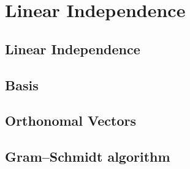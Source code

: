 \section{Linear Independence}
\subsection{Linear Independence}
\subsection{Basis}
\subsection{Orthonomal Vectors}
\subsection{Gram–Schmidt algorithm}